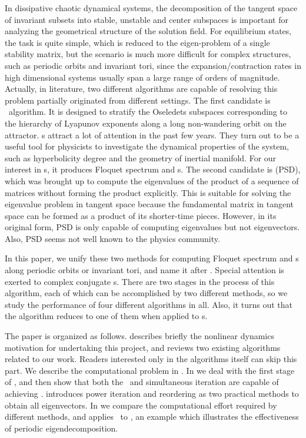 \documentclass[final,leqno,onefignum,onetabnum]{siamltexmm}
\begin{document}
In dissipative chaotic dynamical systems, the decomposition of the
tangent space of invariant subsets into
stable, unstable and center subspaces is important for analyzing the
geometrical structure of the solution field.
For equilibrium {states},
the task is quite simple, which is reduced to the eigen-problem of
a single stability matrix, but the scenario is much more difficult
for complex structures, such as periodic orbits and invariant {tori},
since the expansion/contraction rates in high dimensional systems usually
span a large range of {orders of} magnitude. Actually, in literature, two different
algorithms are capable of resolving this problem partially originated
from different settings. The first candidate is \cLv\
algorithm{}.
It is designed to stratify the Oseledets subspaces
corresponding to
the hierarchy of Lyapunov exponents along a long non-wandering orbit
on the attractor. \CLv s attract a lot of attention in the past few
years. They
turn out to be a useful tool for physicists
to investigate the dynamical properties of the system, such as
hyperbolicity degree and the geometry of
inertial manifold\rf{TaGiCh11, YaRa11, YaTaGiChRa08}.
For our
interest in \po s, it produces
Floquet spectrum and \Fv s. The second candidate is
\psd (PSD), which
was brought up to compute the eigenvalues of the product of a
sequence of matrices without forming the product explicitly. This is suitable
for solving the eigenvalue problem in tangent space because the
fundamental matrix in tangent space can be formed as a product of its shorter-time
pieces. However, in its original form, PSD is only capable of computing
eigenvalues but not eigenvectors. Also, PSD seems not well known to the
physics community.

In this paper, we unify these two methods for
computing Floquet spectrum and \Fv s along periodic orbits or invariant
tori, and name it after \emph{\ped}. Special attention is exerted to complex conjugate \Fv s.
There are two stages in the process of this algorithm,
each of which can be accomplished by two different methods, so
we study the performance of four different algorithms in all. Also,
it turns
out that the {\cLv} algorithm reduces to one of them when
applied to \po s.

The paper is organized as follows.  describes
briefly the nonlinear dynamics motivation for undertaking this project,
and reviews two existing algorithms related to our
work. Readers interested only in the algorithms itself can skip this part.
We describe the
computational problem in . In  
we deal with the first stage of \ped, and then show that both the \pqr\
and simultaneous iteration are capable of achieving \psd.
\refSect{sect:eigenvec} introduces power iteration and reordering as two
practical methods to obtain all eigenvectors. In  we
compare the computational effort required by different methods, and
\refsect{sect:applic} applies \ped\ to \KSe,
{an example which illustrates the effectiveness of periodic eigen\-decomposition}.
\end{document}
